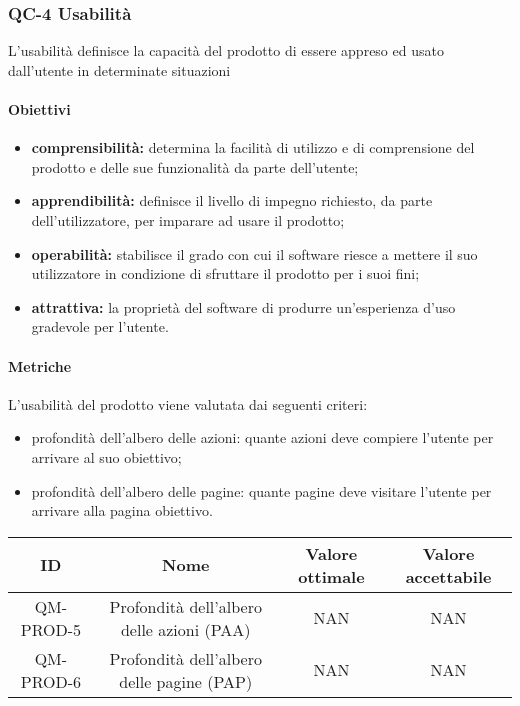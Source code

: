 \subsubsection{QC-4 Usabilità}
L'usabilità definisce la capacità del prodotto di essere appreso ed usato dall'utente in determinate situazioni
	\paragraph{Obiettivi}
		\begin{itemize}
			\item \textbf{comprensibilità:} determina la facilità di utilizzo e di comprensione del prodotto e delle sue funzionalità da parte dell'utente;
			\item \textbf{apprendibilità:} definisce il livello di impegno richiesto, da parte dell'utilizzatore, per imparare ad usare il prodotto;
			\item \textbf{operabilità:} stabilisce il grado con cui il software riesce a mettere il suo utilizzatore in condizione di sfruttare il prodotto per i suoi fini;
			\item \textbf{attrattiva:} la proprietà del software di produrre un'esperienza d'uso gradevole per l'utente.
		\end{itemize}
	\paragraph{Metriche}
	L'usabilità del prodotto viene valutata dai seguenti criteri:
	\begin{itemize}
		\item profondità dell'albero delle azioni: quante azioni deve compiere l'utente per arrivare al suo obiettivo;
		\item profondità dell'albero delle pagine: quante pagine deve visitare l'utente per arrivare alla pagina obiettivo.
	\end{itemize}
	\begin{center}
		\begin{tabular}{|c|c|c|c|}
			\rowcolor{lighter-grayer}
			\hline
			ID & Nome & Valore ottimale & Valore accettabile \\
			\hline
			QM-PROD-5 & Profondità dell'albero delle azioni (PAA) & NAN & NAN \\
			\hline
			QM-PROD-6 & Profondità dell'albero delle pagine (PAP) & NAN & NAN \\
			\hline
		\end{tabular}
	\end{center}
